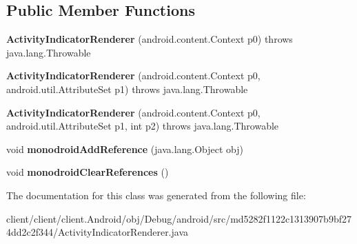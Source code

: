 \subsection*{Public Member Functions}
\begin{DoxyCompactItemize}
\item 
\hypertarget{classmd5282f1122c1313907b9bf274dd2c2f344_1_1ActivityIndicatorRenderer_a4bd14ded8288ff351ee8c74b65ff0a2b}{}{\bfseries Activity\+Indicator\+Renderer} (android.\+content.\+Context p0)  throws java.\+lang.\+Throwable 	\label{classmd5282f1122c1313907b9bf274dd2c2f344_1_1ActivityIndicatorRenderer_a4bd14ded8288ff351ee8c74b65ff0a2b}

\item 
\hypertarget{classmd5282f1122c1313907b9bf274dd2c2f344_1_1ActivityIndicatorRenderer_ac16ebe15e3fa91060a269b847ea8b7a2}{}{\bfseries Activity\+Indicator\+Renderer} (android.\+content.\+Context p0, android.\+util.\+Attribute\+Set p1)  throws java.\+lang.\+Throwable 	\label{classmd5282f1122c1313907b9bf274dd2c2f344_1_1ActivityIndicatorRenderer_ac16ebe15e3fa91060a269b847ea8b7a2}

\item 
\hypertarget{classmd5282f1122c1313907b9bf274dd2c2f344_1_1ActivityIndicatorRenderer_a983c3da3e3e6a363ba01323a479ce725}{}{\bfseries Activity\+Indicator\+Renderer} (android.\+content.\+Context p0, android.\+util.\+Attribute\+Set p1, int p2)  throws java.\+lang.\+Throwable 	\label{classmd5282f1122c1313907b9bf274dd2c2f344_1_1ActivityIndicatorRenderer_a983c3da3e3e6a363ba01323a479ce725}

\item 
\hypertarget{classmd5282f1122c1313907b9bf274dd2c2f344_1_1ActivityIndicatorRenderer_a54e58a7ce7cb8dbbd2653afc5d3a7dad}{}void {\bfseries monodroid\+Add\+Reference} (java.\+lang.\+Object obj)\label{classmd5282f1122c1313907b9bf274dd2c2f344_1_1ActivityIndicatorRenderer_a54e58a7ce7cb8dbbd2653afc5d3a7dad}

\item 
\hypertarget{classmd5282f1122c1313907b9bf274dd2c2f344_1_1ActivityIndicatorRenderer_ab608d0b3cde262d5dcb4c27fb87240a1}{}void {\bfseries monodroid\+Clear\+References} ()\label{classmd5282f1122c1313907b9bf274dd2c2f344_1_1ActivityIndicatorRenderer_ab608d0b3cde262d5dcb4c27fb87240a1}

\end{DoxyCompactItemize}


The documentation for this class was generated from the following file\+:\begin{DoxyCompactItemize}
\item 
client/client/client.\+Android/obj/\+Debug/android/src/md5282f1122c1313907b9bf274dd2c2f344/Activity\+Indicator\+Renderer.\+java\end{DoxyCompactItemize}

